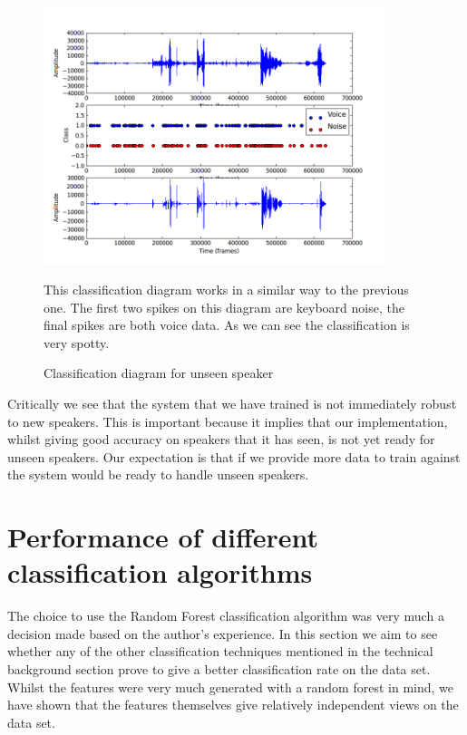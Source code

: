 \documentclass[ %
                    author={Sam Phippen},
                supervisor={Dr. Rafal Bogacz},
                     title={Real time voice activity detectors in noisy personal computing environments},
                  subtitle={},
                    degree={MEng},
                      year={2012} ]{thesis}
\begin{document}
\begin{figure}
    \begin{center}

        \includegraphics[width=10cm]{peter.png}
    \end{center}

    This classification diagram works in a similar way to the previous one. The
    first two spikes on this diagram are keyboard noise, the final spikes are
    both voice data. As we can see the classification is very spotty.

    \caption{Classification diagram for unseen speaker}
    \label{fig:waveform_unseen}

\end{figure}

Critically we see that the system that we have trained is not immediately
robust to new speakers. This is important because it implies that our
implementation, whilst giving good accuracy on speakers that it has seen, is
not yet ready for unseen speakers. Our expectation is that if we provide more
data to train against the system would be ready to handle unseen speakers.

\section{Performance of different classification algorithms}

The choice to use the Random Forest classification algorithm was very much a
decision made based on the author's experience. In this section we aim to see
whether any of the other classification techniques mentioned in the technical
background section prove to give a better classification rate on the data set.
Whilst the features were very much generated with a random forest in mind, we
have shown that the features themselves give relatively independent views on
the data set.
\end{document}
